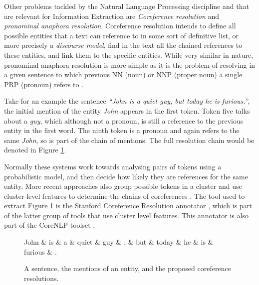 \documentclass[11pt,a4paper,openright]{memoir}
\begin{document}
Other problems tackled by the Natural Language Processing discipline and that are relevant for Information Extraction are \emph{Coreference resolution} and \emph{pronominal anaphora resolution}. Coreference resolution intends to define all possible entities that a text can reference to in some sort of definitive list, or more precisely a \emph{discourse model}, find in the text all the chained references to these entities, and link them to the specific entities. While very similar in nature, pronominal anaphora resolution is more simple as it is the problem of resolving in a given sentence to which previous NN (noun) or NNP (proper noun) a single PRP (pronoun) refers to \cite{Jurafsky:2000:SLP:555733}.

Take for an example the sentence \emph{\enquote{John is a quiet guy, but today he is furious.}}, the initial mention of the entity \emph{John} appears in the first token. Token five talks about a \emph{guy}, which although not a pronoun, is still a reference to the previous entity in the first word. The ninth token is a pronoun and again refers to the same \emph{John}, so is part of the chain of mentions. The full resolution chain would be denoted in Figure \ref{fig:sub_sentences_coreference}.

Normally these systems work towards analysing pairs of tokens using a probabilistic model, and then decide how likely they are references for the same entity. More recent approaches also group possible tokens in a cluster and use cluster-level features to determine the chains of coreferences \cite{clark2015entity}. The tool used to extract Figure \ref{fig:sub_sentences_coreference} is the Stanford Coreference Resolution annotator \cite{clark2015entity}, which is part of the latter group of tools that use cluster level features. This annotator is also part of the CoreNLP toolset \cite{manning-EtAl:2014:P14-5}.

\begin{figure}[!htbp]
  \centering
\begin{dependency}[theme = simple]
   \begin{deptext}[column sep=1em]
      John \& is \& a \& quiet \& guy \& , \& but \& today \& he \& is \& furious \& . \\
   \end{deptext}
\end{dependency}
  \caption[A sentence, the mentions of an entity, and the proposed coreference resolutions.]{A sentence, the mentions of an entity, and the proposed coreference resolutions.}
  \label{fig:sub_sentences_coreference}
\end{figure}
\end{document}
